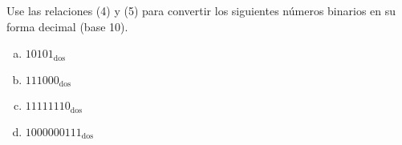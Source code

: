 \begin{enunciado}
 Use las relaciones (4) y (5) para convertir los siguientes n\'umeros binarios en su forma decimal (base 10).
 \begin{multicols}{2}
  \begin{enumerate}[(a)]
   \item $10101_{\text{dos}}$
   \item $111000_{\text{dos}}$
  \end{enumerate}
 \end{multicols}
 \begin{multicols}{2}
  \begin{enumerate}[(a)]
   \setcounter{enumii}{2}
   \item $11111110_{\text{dos}}$
   \item $1000000111_{\text{dos}}$
  \end{enumerate}
 \end{multicols}
\end{enunciado}

